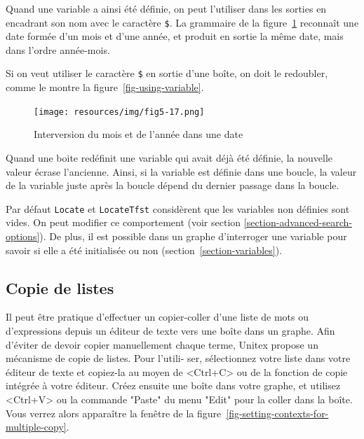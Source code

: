 \bigskip
\noindent Quand une variable a ainsi été définie, on peut l’utiliser dans les sorties en encadrant
son nom avec le caractère \verb+$+.\index{\verbt{\$}} La grammaire de la
figure~\ref{fig-date-grammar} reconnaît une date formée d’un mois et d’une année,
 et produit en sortie la même date, mais dans l’ordre année-mois.

\bigskip
\noindent Si on veut utiliser le caractère \verb+$+ en sortie d'une boîte, on doit le
redoubler, comme le montre la figure~\ref{fig-using-variable}.

\begin{figure}[!ht]
\begin{center}
\texttt{[image: resources/img/fig5-17.png]}
\caption{Interversion du mois et de l’année dans une date\label{fig-date-grammar}}
\end{center}
\end{figure}

\bigskip
\noindent Quand une boite redéfinit une variable qui avait déjà été définie,
 la nouvelle valeur écrase l'ancienne.
Ainsi, si la variable est définie dans une boucle, la valeur de la variable juste après
la boucle dépend du dernier passage dans la boucle.

\bigskip
\noindent Par défaut \verb+Locate+ et \verb+LocateTfst+ considèrent que les variables non définies
sont vides.
On peut modifier ce comportement (voir section \ref{section-advanced-search-options}).
De plus, il est  possible dans un graphe d'interroger une variable pour savoir si elle a été initialisée ou non (section~\ref{section-variables}).

\subsection{Copie de listes}

Il peut être pratique d’effectuer un copier-coller d’une liste de mots ou d’expressions
depuis un éditeur de texte vers une boîte dans un graphe. Afin d’éviter de devoir copier
manuellement chaque terme, Unitex propose un mécanisme de copie de listes. Pour l’utili-
ser, sélectionnez votre liste dans votre éditeur de texte et copiez-la au moyen de <Ctrl+C> ou
de la fonction de copie intégrée à votre éditeur. Créez ensuite une boîte dans votre graphe,
et utilisez <Ctrl+V> ou la commande "Paste" du menu "Edit" pour la coller dans la boîte.
Vous verrez alors apparaître la fenêtre de la figure~\ref{fig-setting-contexts-for-multiple-copy}.


